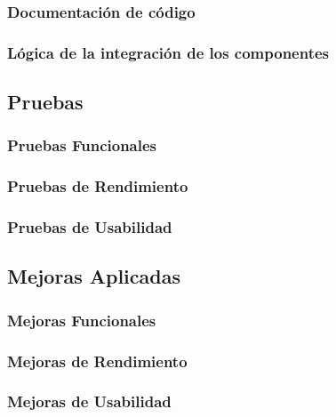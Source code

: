         \subsubsection{Documentación de código}
        \subsubsection{Lógica de la integración de los componentes}

    \subsection{Pruebas}


        \subsubsection{Pruebas Funcionales}
        \subsubsection{Pruebas de Rendimiento}
        \subsubsection{Pruebas de Usabilidad}

    \subsection{Mejoras Aplicadas}
        \subsubsection{Mejoras Funcionales}
        \subsubsection{Mejoras de Rendimiento}
        \subsubsection{Mejoras de Usabilidad}